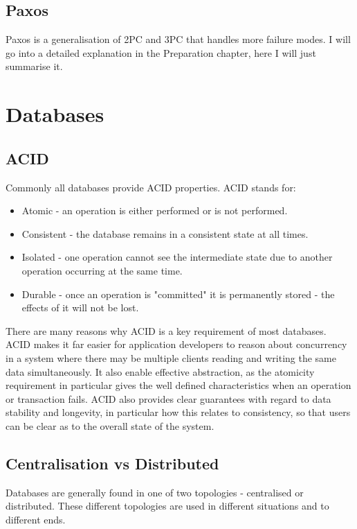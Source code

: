 \documentclass[12pt,twoside,notitlepage]{report}
\begin{document}
\subsection*{Paxos}

Paxos is a generalisation of 2PC and 3PC that handles more failure modes. I will go into a
detailed explanation in the Preparation chapter, here I will just summarise it. 

\section{Databases}

\subsection*{ACID}

Commonly all databases provide ACID properties. ACID stands for:

\begin{itemize}
\item Atomic - an operation is either performed or is not performed.
\item Consistent - the database remains in a consistent state at all times.
\item Isolated - one operation cannot see the intermediate state due to another operation occurring
	at the same time.
\item Durable - once an operation is "committed" it is permanently stored - the effects of it will
	not be lost.
\end{itemize}

There are many reasons why ACID is a key requirement of most databases. ACID makes it far easier
for application developers to reason about concurrency in a system where there may be multiple
clients reading and writing the same data simultaneously. It also enable effective abstraction, as
the atomicity requirement in particular gives the well defined characteristics when an operation
or transaction fails. ACID also provides clear guarantees with regard to data stability and
longevity, in particular how this relates to consistency, so that users can be clear as to the
overall state of the system.

\subsection*{Centralisation vs Distributed}

Databases are generally found in one of two topologies - centralised or distributed. These
different topologies are used in different situations and to different ends.
\end{document}
